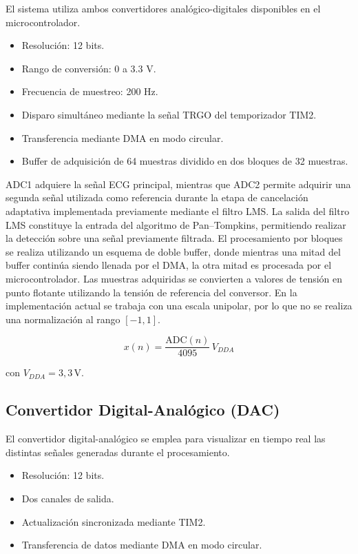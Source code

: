 \documentclass[12pt]{article}
\begin{document}
		El sistema utiliza ambos convertidores analógico-digitales disponibles en el microcontrolador.

		\begin{itemize}
			\item Resolución: 12 bits.
			\item Rango de conversión: 0 a 3.3 V.
			\item Frecuencia de muestreo: 200 Hz.
			\item Disparo simultáneo mediante la señal TRGO del temporizador TIM2.
			\item Transferencia mediante DMA en modo circular.
			\item Buffer de adquisición de 64 muestras dividido en dos bloques de 32 muestras.
		\end{itemize}

		ADC1 adquiere la señal ECG principal, mientras que ADC2 permite adquirir una segunda señal utilizada como referencia durante la etapa de cancelación adaptativa implementada previamente mediante el filtro LMS. La salida del filtro LMS constituye la entrada del algoritmo de Pan--Tompkins, permitiendo realizar la detección sobre una señal previamente filtrada. El procesamiento por bloques se realiza utilizando un esquema de doble buffer, donde mientras una mitad del buffer continúa siendo llenada por el DMA, la otra mitad es procesada por el microcontrolador.
		Las muestras adquiridas se convierten a valores de tensión en punto flotante utilizando la tensión de referencia del conversor. En la implementación actual se trabaja con una escala unipolar, por lo que no se realiza una normalización al rango $[-1,1]$.

		\[
		x(n)=\frac{\mathrm{ADC}(n)}{4095}\,V_{DDA}
		\]

		con $V_{DDA}=3{,}3\,\mathrm{V}$.

		\subsection{Convertidor Digital-Analógico (DAC)}

		El convertidor digital-analógico se emplea para visualizar en tiempo real las distintas señales generadas durante el procesamiento.

		\begin{itemize}
			\item Resolución: 12 bits.
			\item Dos canales de salida.
			\item Actualización sincronizada mediante TIM2.
			\item Transferencia de datos mediante DMA en modo circular.
		\end{itemize}
\end{document}
